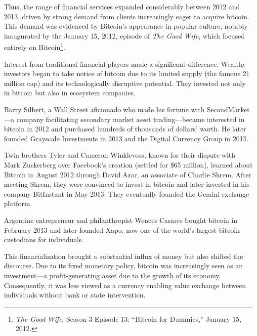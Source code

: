 \documentclass[
  a5paper,
  smalldemyvopaper,10pt,twoside,onecolumn,openright,extrafontsizes,hidelinks]{memoir}
\begin{document}
Thus, the range of financial services expanded considerably between 2012
and 2013, driven by strong demand from clients increasingly eager to
acquire bitcoin. This demand was evidenced by Bitcoin's appearance in
popular culture, notably inaugurated by the January 15, 2012, episode of
\emph{The Good Wife}, which focused entirely on Bitcoin\footnote{\emph{The
  Good Wife}, Season 3 Episode 13: ``Bitcoin for Dummies,'' January 15,
  2012.}.

Interest from traditional financial players made a significant
difference. Wealthy investors began to take notice of bitcoin due to its
limited supply (the famous 21 million cap) and its technologically
disruptive potential. They invested not only in bitcoin but also in
ecosystem companies.

Barry Silbert, a Wall Street aficionado who made his fortune with
SecondMarket---a company facilitating secondary market asset
trading---became interested in bitcoin in 2012 and purchased hundreds of
thousands of dollars' worth. He later founded Grayscale Investments in
2013 and the Digital Currency Group in 2015.

Twin brothers Tyler and Cameron Winklevoss, known for their dispute with
Mark Zuckerberg over Facebook's creation (settled for \$65 million),
learned about Bitcoin in August 2012 through David Azar, an associate of
Charlie Shrem. After meeting Shrem, they were convinced to invest in
bitcoin and later invested in his company BitInstant in May 2013. They
eventually founded the Gemini exchange platform.

Argentine entrepreneur and philanthropist Wences Casares bought bitcoin
in February 2013 and later founded Xapo, now one of the world's largest
bitcoin custodians for individuals.

This financialization brought a substantial influx of money but also
shifted the discourse. Due to its fixed monetary policy, bitcoin was
increasingly seen as an investment---a profit-generating asset due to
the growth of its economy. Consequently, it was less viewed as a
currency enabling value exchange between individuals without bank or
state intervention.
\end{document}
